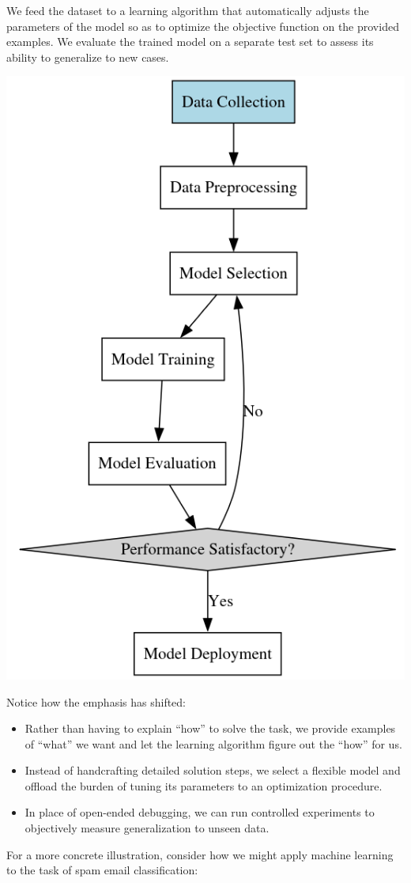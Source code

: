 \documentclass[
  9pt,
  letterpaper,
  abstract,
  titlepage]{scrbook}
\begin{document}
We feed the dataset to a learning algorithm that automatically adjusts
the parameters of the model so as to optimize the objective function on
the provided examples. We evaluate the trained model on a separate test
set to assess its ability to generalize to new cases.

\begin{center}
\includegraphics[width=0.4\linewidth,height=\textheight,keepaspectratio]{contents/core/img/chapter10_mlworkflow.png}
\end{center}

Notice how the emphasis has shifted:

\begin{itemize}
\item
  Rather than having to explain ``how'' to solve the task, we provide
  examples of ``what'' we want and let the learning algorithm figure out
  the ``how'' for us.
\item
  Instead of handcrafting detailed solution steps, we select a flexible
  model and offload the burden of tuning its parameters to an
  optimization procedure.
\item
  In place of open-ended debugging, we can run controlled experiments to
  objectively measure generalization to unseen data.
\end{itemize}

For a more concrete illustration, consider how we might apply machine
learning to the task of spam email classification:
\end{document}
